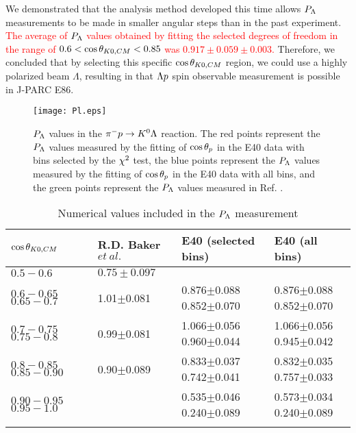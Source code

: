We demonstrated that the analysis method developed this time allows $P_{\Lambda}$ measurements to be made in smaller angular steps than in the past experiment. \textcolor{red}{ The average of $P_{\Lambda}$ values obtained by fitting the selected degrees of freedom in the range of $0.6<\cos{\theta_{K0,CM}}<0.85$ was $0.917\pm0.059\pm0.003$. } Therefore, we concluded that by selecting this specific $\cos{\theta_{K0,CM}}$ region, we could use a highly polarized beam $\Lambda$, resulting in that $\Lambda p$ spin observable measurement is possible in J-PARC E86.

\begin{figure}[h]
  \centering
  \texttt{[image: Pl.eps]}
  \caption{$P_{\Lambda}$ values in the $\pi^- p \to K^0 \Lambda$ reaction. The red points represent the $P_{\Lambda}$ values measured by the fitting of $\cos{\theta_p}$ in the E40 data with bins selected by the $\chi^{2}$ test, the blue points represent the $P_{\Lambda}$ values measured by the fitting of $\cos{\theta_p}$ in the E40 data with all bins, and the green points represent the $P_{\Lambda}$ values measured in Ref. \cite{Baker}.}
  \label{fig-Pl}
\end{figure}


\begin{table}[!h] 
  \begin{center}
  \caption{Numerical values included in the $P_{\Lambda}$ measurement}
    \begin{tabular}%
    {m{2cm} m{3cm} m{4cm} m{3cm}}
    $\cos{\theta_{K0,CM}}$ & R.D. Baker $et\ al.$ & E40 (selected bins) & E40 (all bins) \\
    \midrule\midrule
    $0.5-0.6$ & $0.75\pm0.097$ & & \\
    \midrule
    $0.6-0.65$ $0.65-0.7$ & 1.01$\pm$0.081 & 0.876$\pm$0.088 0.852$\pm$0.070 & 0.876$\pm$0.088 0.852$\pm$0.070 \\
    \midrule
    $0.7-0.75$ $0.75-0.8$ & 0.99$\pm$0.081 & 1.066$\pm$0.056 0.960$\pm$0.044 & 1.066$\pm$0.056 0.945$\pm$0.042 \\
    \midrule
    $0.8-0.85$ $0.85-0.90$ & 0.90$\pm$0.089 & 0.833$\pm$0.037 0.742$\pm$0.041 & 0.832$\pm$0.035 0.757$\pm$0.033 \\
    \midrule
    $0.90-0.95$ $0.95-1.0$ & & 0.535$\pm$0.046 0.240$\pm$0.089 & 0.573$\pm$0.034 0.240$\pm$0.089 \\
    \label{tab-Pl}
    \end{tabular}
  \end{center}
\end{table}


\clearpage
